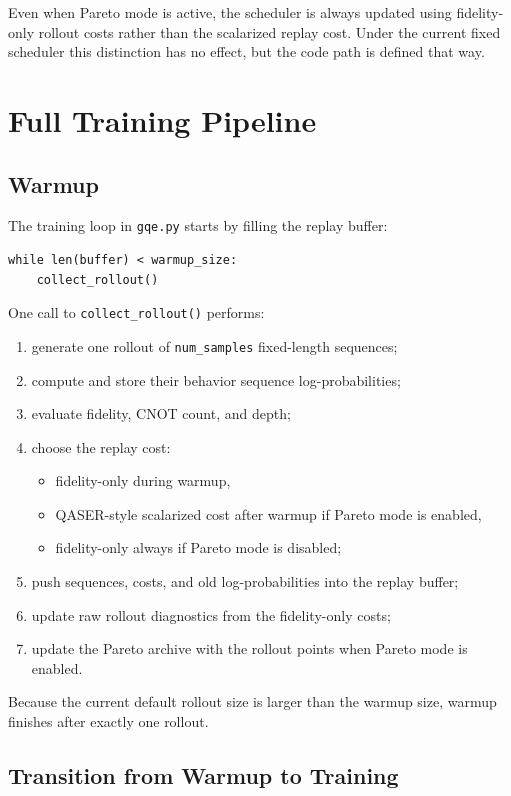 \documentclass[11pt]{article}
\begin{document}
Even when Pareto mode is active, the scheduler is always updated using fidelity-only rollout costs rather than the scalarized replay cost. Under the current fixed scheduler this distinction has no effect, but the code path is defined that way.

\section{Full Training Pipeline}

\subsection{Warmup}

The training loop in \texttt{gqe.py} starts by filling the replay buffer:
\begin{verbatim}
while len(buffer) < warmup_size:
    collect_rollout()
\end{verbatim}

One call to \texttt{collect\_rollout()} performs:
\begin{enumerate}[leftmargin=*]
\item generate one rollout of \texttt{num\_samples} fixed-length sequences;
\item compute and store their behavior sequence log-probabilities;
\item evaluate fidelity, CNOT count, and depth;
\item choose the replay cost:
  \begin{itemize}[leftmargin=*]
  \item fidelity-only during warmup,
  \item QASER-style scalarized cost after warmup if Pareto mode is enabled,
  \item fidelity-only always if Pareto mode is disabled;
  \end{itemize}
\item push sequences, costs, and old log-probabilities into the replay buffer;
\item update raw rollout diagnostics from the fidelity-only costs;
\item update the Pareto archive with the rollout points when Pareto mode is enabled.
\end{enumerate}

Because the current default rollout size is larger than the warmup size, warmup finishes after exactly one rollout.

\subsection{Transition from Warmup to Training}
\end{document}
